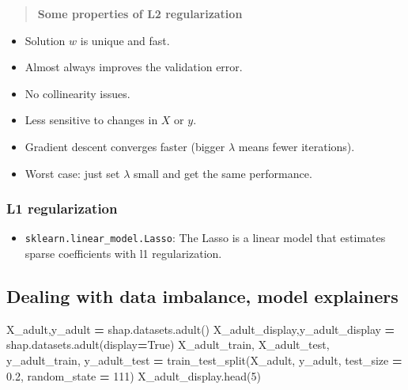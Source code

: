 \documentclass[]{article}
\newenvironment{Shaded}{\begin{snugshade}}{\end{snugshade}}
\newcommand{\DecValTok}[1]{\textcolor[rgb]{0.00,0.00,0.81}{#1}}
\newcommand{\FloatTok}[1]{\textcolor[rgb]{0.00,0.00,0.81}{#1}}
\newcommand{\NormalTok}[1]{#1}
\newcommand{\OperatorTok}[1]{\textcolor[rgb]{0.81,0.36,0.00}{\textbf{#1}}}
\newcommand{\VariableTok}[1]{\textcolor[rgb]{0.00,0.00,0.00}{#1}}
\providecommand{\tightlist}{%
  \setlength{\itemsep}{0pt}\setlength{\parskip}{0pt}}
\begin{document}
\begin{quote}
\textbf{Some properties of L2 regularization}
\end{quote}

\begin{itemize}
\tightlist
\item
  Solution \(w\) is unique and fast.
\item
  Almost always improves the validation error.
\item
  No collinearity issues.
\item
  Less sensitive to changes in \(X\) or \(y\).
\item
  Gradient descent converges faster (bigger \(\lambda\) means fewer
  iterations).
\item
  Worst case: just set \(\lambda\) small and get the same performance.
\end{itemize}

\hypertarget{l1-regularization}{%
\subsubsection{L1 regularization}\label{l1-regularization}}

\begin{itemize}
\tightlist
\item
  \texttt{sklearn.linear\_model.Lasso}: The Lasso is a linear model that
  estimates sparse coefficients with l1 regularization.
\end{itemize}

\hypertarget{dealing-with-data-imbalance-model-explainers}{%
\subsection{Dealing with data imbalance, model
explainers}\label{dealing-with-data-imbalance-model-explainers}}

\begin{Shaded}
\begin{Highlighting}[]
\NormalTok{X_adult,y_adult }\OperatorTok{=}\NormalTok{ shap.datasets.adult()}
\NormalTok{X_adult_display,y_adult_display }\OperatorTok{=}\NormalTok{ shap.datasets.adult(display}\OperatorTok{=}\VariableTok{True}\NormalTok{)}
\NormalTok{X_adult_train, X_adult_test, y_adult_train, y_adult_test }\OperatorTok{=}\NormalTok{ train_test_split(X_adult, y_adult, test_size }\OperatorTok{=} \FloatTok{0.2}\NormalTok{, random_state }\OperatorTok{=} \DecValTok{111}\NormalTok{)}
\NormalTok{X_adult_display.head(}\DecValTok{5}\NormalTok{)}
\end{Highlighting}
\end{Shaded}
\end{document}
